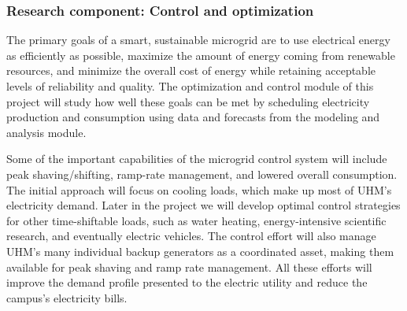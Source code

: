 
\subsubsection{Research component: Control and optimization}
\label{sec:control}

The primary goals of a smart, sustainable microgrid are to use electrical
energy as efficiently as possible, maximize the amount of energy coming
from renewable resources, and minimize the overall cost of energy while
retaining acceptable levels of reliability and quality. The optimization
and control module of this project will study how well
these goals can be met by scheduling electricity production and consumption
using data and forecasts from the modeling and analysis module.

Some of the important capabilities of the microgrid control system will
include peak shaving/shifting, ramp-rate management, and lowered overall
consumption.  The initial approach will focus on cooling loads, which make
up most of UHM's electricity demand.  Later in the project we will develop
optimal control strategies for other time-shiftable loads, such as water
heating, energy-intensive scientific research, and eventually electric
vehicles. The control effort will also manage UHM's many individual backup
generators as a coordinated asset, making them available for peak shaving
and ramp rate management. All these efforts will improve the demand profile
presented to the electric utility and reduce the campus's electricity
bills.

